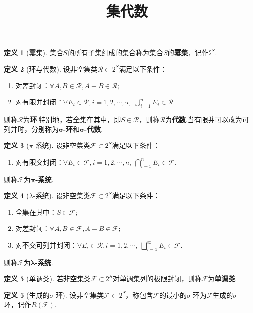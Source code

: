 \documentclass[12pt]{ctexart}
\title{\vspace{-2em}\textbf{集代数}\vspace{-2em}}
\date{ }
\theoremstyle{definition}
\newtheorem{definition}{定义}
\theoremstyle{plain}
\begin{document}
	\maketitle
	\begin{definition}[幂集]
		集合$S$的所有子集组成的集合称为集合$S$的\textbf{幂集}，记作$2^S$.
	\end{definition}
	\begin{definition}[环与代数]
		设非空集类$\mathcal{R}\subset 2^S$满足以下条件：
		\begin{enumerate}
			\item 对差封闭：$\forall A,B\in\mathcal{R},A-B\in\mathcal{R}$;
			\item 对有限并封闭：$\forall E_i\in\mathcal{R},i=1,2,\cdots,n,\ \bigcup_{i=1}^{n}E_i\in\mathcal{R}$.
		\end{enumerate}
		则称$\mathcal{R}$为\textbf{环}.特别地，若全集在其中，即$S\in\mathcal{R}$，则称$\mathcal{R}$为\textbf{代数}.当有限并可以改为可列并时，分别称为$\boldsymbol{\sigma}$\textbf{-环}和$\boldsymbol{\sigma}$\textbf{-代数}.
	\end{definition}
	\begin{definition}[$\pi$-系统]
		设非空集类$\mathcal{F}\subset 2^S$满足以下条件：
		\begin{enumerate}
			\item 对有限交封闭：$\forall E_i\in\mathcal{F},i=1,2,\cdots,n,\ \bigcap_{i=1}^{n}E_i\in\mathcal{F}$.
		\end{enumerate}
		则称$\mathcal{F}$为$\boldsymbol{\pi}$\textbf{-系统}.
	\end{definition}
	\begin{definition}[$\lambda$-系统]
		设非空集类$\mathcal{F}\subset 2^S$满足以下条件：
		\begin{enumerate}
			\item 全集在其中：$S\in\mathcal{F}$;
			\item 对差封闭：$\forall A,B\in\mathcal{F},A-B\in\mathcal{F}$;
			\item 对不交可列并封闭：$\forall E_i\in\mathcal{R},i=1,2,\cdots,\ \bigsqcup_{i=1}^{\infty}E_i\in\mathcal{F}$.
		\end{enumerate}
		则称$\mathcal{F}$为$\boldsymbol{\lambda}$\textbf{-系统}.
	\end{definition}
	\begin{definition}[单调类]
		若非空集类$\mathcal{F}\subset 2^S$对单调集列的极限封闭，则称$\mathcal{F}$为\textbf{单调类}.
	\end{definition}
	\begin{definition}[生成的$\sigma$-环]
		设非空集类$\mathcal{F}\subset 2^S$，称包含$\mathcal{F}$的最小的$\sigma$-环为$\mathcal{F}$生成的$\sigma$-环，记作$R(\mathcal{F})$.
	\end{definition}
\end{document}
